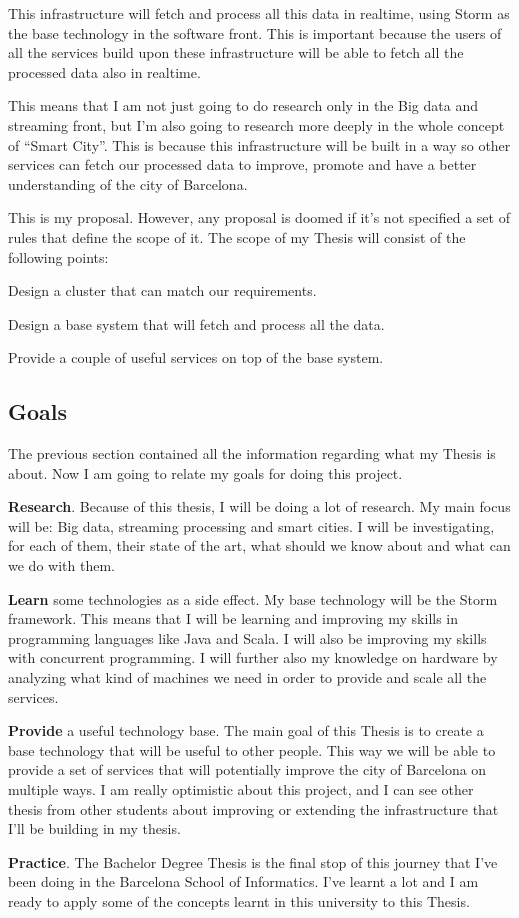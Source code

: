 This infrastructure will fetch and process all this data in realtime, using
Storm as the base technology in the software front. This is important because
the users of all the services build upon these infrastructure will be able to
fetch all the processed data also in realtime.

This means that I am not just going to do research only in the Big data and
streaming front, but I'm also going to research more deeply in the whole concept
of ``Smart City''. This is because this infrastructure will be built in a way
so other services can fetch our processed data to improve, promote and have a
better understanding of the city of Barcelona.

This is my proposal. However, any proposal is doomed if it's not specified a set
of rules that define the scope of it. The scope of my Thesis will consist of
the following points:

\mylist
  \item Design a cluster that can match our requirements.
  \item Design a base system that will fetch and process all the data.
  \item Provide a couple of useful services on top of the base system.
\mylistend

\subsection{Goals}

The previous section contained all the information regarding what my Thesis is
about. Now I am going to relate my goals for doing this project.

\mylist
  \item {\bf Research}. Because of this thesis, I will be doing a lot of
research. My main focus will be: Big data, streaming processing and smart
cities. I will be investigating, for each of them, their state of the art, what
should we know about and what can we do with them.
  \item {\bf Learn} some technologies as a side effect. My base technology will
be the Storm framework. This means that I will be learning and improving my
skills in programming languages like Java and Scala. I will also be improving my
skills with concurrent programming. I will further also my knowledge on hardware
by analyzing what kind of machines we need in order to provide and scale all the
services.
  \item {\bf Provide} a useful technology base. The main goal of this Thesis is
to create a base technology that will be useful to other people. This way we
will be able to provide a set of services that will potentially improve the
city of Barcelona on multiple ways. I am really optimistic about this project,
and I can see other thesis from other students about improving or extending the
infrastructure that I'll be building in my thesis.
  \item {\bf Practice}. The Bachelor Degree Thesis is the final stop of this
journey that I've been doing in the Barcelona School of Informatics. I've
learnt a lot and I am ready to apply some of the concepts learnt in this
university to this Thesis.

